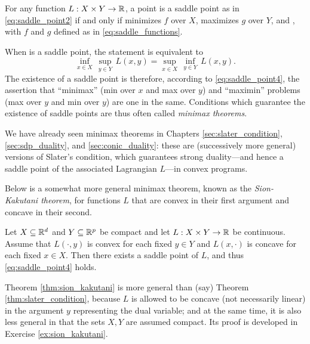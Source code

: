 \begin{Theorem}
\label{thm:saddle_point_optimality2}
For any function $L : X \times Y \to \mathbb{R}$, a point  is a saddle point as in \eqref{eq:saddle_point2} if and only if 
 minimizes $f$ over $X$,  maximizes $g$ 
over $Y$, and , with $f$ and $g$ defined as in   
\eqref{eq:saddle_functions}. 
\end{Theorem}

When  is a saddle point, the
statement  is equivalent to 
\begin{equation}
\label{eq:saddle_point4}
\inf_{x \in X} \, \sup_{y \in Y} \, L(x,y) = \sup_{x \in X} \, \inf_{y \in Y} \,
L(x,y).
\end{equation}
The existence of a saddle point is therefore, according to
\eqref{eq:saddle_point4}, the assertion that ``minimax'' (min over $x$ and max
over $y$) and ``maximin'' problems (max over $y$ and min over $y$) are one in
the same. Conditions which guarantee the existence of saddle points are
thus often called \emph{minimax theorems}. 

We have already seen minimax theorems in Chapters \ref{sec:slater_condition},
\ref{sec:sdp_duality}, and \ref{sec:conic_duality}: these are (successively more  
general) versions of Slater's condition, which guarantees strong duality---and 
hence a saddle point of the associated Lagrangian $L$---in convex programs.   

Below is a somewhat more general minimax theorem, known as the
\emph{Sion-Kakutani theorem}, for functions $L$ that are convex in their first
argument and concave in their second.

\begin{Theorem}
\label{thm:sion_kakutani}
Let $X \subseteq \mathbb{R}^d$ and $Y \subseteq \mathbb{R}^p$ be compact and let $L : X \times Y
\to \mathbb{R}$ be continuous. Assume that $L(\cdot,y)$ is convex for each fixed $y \in
Y$ and $L(x,\cdot)$ is concave for each fixed $x \in X$. Then there exists a
saddle point  of $L$, and thus
\eqref{eq:saddle_point4} holds. 
\end{Theorem}

Theorem \ref{thm:sion_kakutani} is more general than (say) Theorem
\ref{thm:slater_condition}, because $L$ is allowed to be concave (not
necessarily linear) in the argument $y$ representing the dual variable; and at
the same time, it is also less general in that the sets $X,Y$ are assumed
compact. Its proof is developed in Exercise \ref{ex:sion_kakutani}.  

